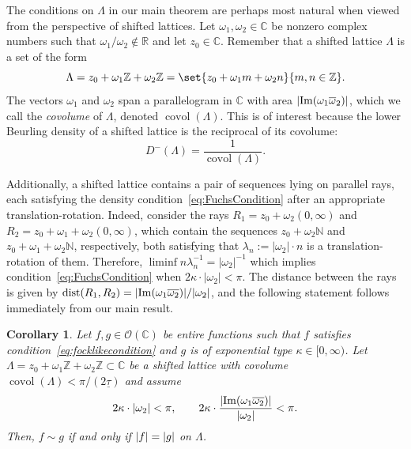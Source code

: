 \documentclass{article}
\newcommand{\bbC}{\mathbb{C}}
\newcommand{\bbN}{\mathbb{N}}
\newcommand{\bbR}{\mathbb{R}}
\newcommand{\bbZ}{\mathbb{Z}}
\newcommand{\calO}{\mathcal{O}}
\DeclarePairedDelimiter{\abs}{\lvert}{\rvert}
\renewcommand{\Im}{\operatorname{Im}}
\newtheorem{corollary}{Corollary}
\theoremstyle{remark}
\begin{document}
    The conditions on $\Lambda$ in our main theorem are perhaps most natural when viewed from the perspective of shifted lattices. Let $\omega_1, \omega_2 \in \bbC$ be nonzero complex numbers such that $\omega_1/\omega_2 \not\in \bbR$ and let $z_0 \in \bbC$. Remember that a shifted lattice $\Lambda$ is a set of the form
    \begin{equation*}
        \Lambda = z_0 + \omega_1 \bbZ + \omega_2 \bbZ = \set{ z_0 + \omega_1 m + \omega_2 n }{ m, n \in \bbZ }.
    \end{equation*}
    The vectors $\omega_1$ and $\omega_2$ span a parallelogram in $\bbC$ with area $\abs{\Im(\omega_1 \overline \omega_2)}$, which we call the \emph{covolume} of $\Lambda$, denoted $\operatorname{covol}(\Lambda)$. This is of interest because the lower Beurling density of a shifted lattice is the reciprocal of its covolume:
    \begin{equation*}
        D^{-}(\Lambda) = \frac{1}{\operatorname{covol}(\Lambda)}.
    \end{equation*}

    Additionally, a shifted lattice contains a pair of sequences lying on parallel rays, each satisfying the density condition~\eqref{eq:FuchsCondition} after an appropriate translation-rotation. Indeed, consider the rays $R_1 = z_0 + \omega_2 (0,\infty)$ and $R_2 = z_0 + \omega_1 + \omega_2 (0,\infty)$, which contain the sequences $z_0 + \omega_2 \bbN$ and $z_0 + \omega_1 + \omega_2 \bbN$, respectively, both satisfying that $\lambda_n := \lvert \omega_2 \rvert \cdot n$ is a translation-rotation of them. Therefore, $\liminf n \lambda_n^{-1} = \lvert \omega_2 \rvert^{-1}$ which implies condition~\eqref{eq:FuchsCondition} when $2 \kappa \cdot \lvert \omega_2 \rvert < \pi$. The distance between the rays is given by $\operatorname{dist}(R_1, R_2) = \abs{\Im(\omega_1 \overline{\omega_2})}/\abs{\omega_2}$, and the following statement follows immediately from our main result.

    \begin{corollary}\label{cor:ShiftedLattice}
        Let $f, g \in \calO(\bbC)$ be entire functions such that $f$ satisfies condition~\eqref{eq:focklikecondition} and $g$ is of exponential type $\kappa \in [0, \infty)$. Let $\Lambda = z_0 + \omega_1 \bbZ + \omega_2 \bbZ \subset \mathbb{C}$ be a shifted lattice with covolume $\operatorname{covol}(\Lambda) < \pi/(2\underline \tau)$ and assume
        \begin{equation*}
            2 \kappa \cdot \abs{\omega_2} < \pi, \qquad 2\kappa \cdot \frac{\abs{\Im(\omega_1 \overline{\omega_2})}}{\abs{\omega_2}} < \pi.
        \end{equation*}
        Then, $f \sim g$ if and only if $\abs{f} = \abs{g}$ on $\Lambda$.
    \end{corollary}
\end{document}
